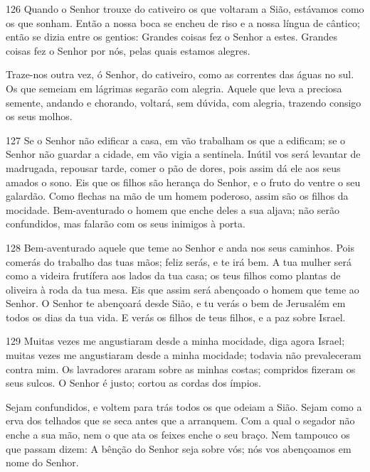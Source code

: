 \bigskip

\lettrine{126}{} Quando o Senhor trouxe do cativeiro os que
voltaram a Sião, estávamos como os que sonham. Então a nossa
boca se encheu de riso e a nossa língua de cântico; então se dizia
entre os gentios: Grandes coisas fez o Senhor a estes. Grandes
coisas fez o Senhor por nós, pelas quais estamos alegres.

Traze-nos outra vez, ó Senhor, do cativeiro, como as correntes das
águas no sul. Os que semeiam em lágrimas segarão com alegria.
Aquele que leva a preciosa semente, andando e chorando, voltará,
sem dúvida, com alegria, trazendo consigo os seus molhos.

\bigskip

\lettrine{127}{} Se o Senhor não edificar a casa, em vão
trabalham os que a edificam; se o Senhor não guardar a cidade, em
vão vigia a sentinela. Inútil vos será levantar de madrugada,
repousar tarde, comer o pão de dores, pois assim dá ele aos seus
amados o sono. Eis que os filhos são herança do Senhor, e o
fruto do ventre o seu galardão. Como flechas na mão de um homem
poderoso, assim são os filhos da mocidade. Bem-aventurado o
homem que enche deles a sua aljava; não serão confundidos, mas
falarão com os seus inimigos à porta.

\bigskip

\lettrine{128}{} Bem-aventurado aquele que teme ao Senhor e anda
nos seus caminhos. Pois comerás do trabalho das tuas mãos; feliz
serás, e te irá bem. A tua mulher será como a videira frutífera
aos lados da tua casa; os teus filhos como plantas de oliveira à
roda da tua mesa. Eis que assim será abençoado o homem que teme
ao Senhor. O Senhor te abençoará desde Sião, e tu verás o bem de
Jerusalém em todos os dias da tua vida. E verás os filhos de
teus filhos, e a paz sobre Israel.

\bigskip

\lettrine{129}{} Muitas vezes me angustiaram desde a minha
mocidade, diga agora Israel; muitas vezes me angustiaram desde a
minha mocidade; todavia não prevaleceram contra mim. Os
lavradores araram sobre as minhas costas; compridos fizeram os seus
sulcos. O Senhor é justo; cortou as cordas dos ímpios.

Sejam confundidos, e voltem para trás todos os que odeiam a Sião.
Sejam como a erva dos telhados que se seca antes que a
arranquem. Com a qual o segador não enche a sua mão, nem o que
ata os feixes enche o seu braço. Nem tampouco os que passam
dizem: A bênção do Senhor seja sobre vós; nós vos abençoamos em nome
do Senhor.

